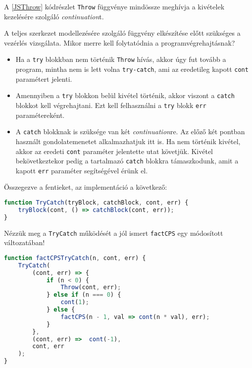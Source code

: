A \ref{JSThrow} kódrészlet \texttt{Throw} függvénye mindössze meghívja a kivételek kezelésére szolgáló \textit{continuation}t.

A teljes szerkezet modellezésére szolgáló függvény elkészítése előtt szükséges a vezérlés vizsgálata. Mikor merre kell folytatódnia a programvégrehajtásnak?

\begin{itemize}
    \item Ha a \texttt{try} blokkban nem történik \texttt{Throw} hívás, akkor úgy fut tovább a program, mintha nem is lett volna \texttt{try-catch}, ami az eredetileg kapott \texttt{cont} paramétert jelenti.
    \item Amennyiben a \texttt{try} blokkon belül kivétel történik, akkor viszont a \texttt{catch} blokkot kell végrehajtani. Ezt kell felhasználni a \texttt{try} blokk \texttt{err} paramétereként.
    \item A \texttt{catch} blokknak is szüksége van két \textit{continuation}re. Az előző két pontban használt gondolatemenetet alkalmazhatjuk itt is. Ha nem történik kivétel, akkor az eredeti \texttt{cont} paraméter jelentette utat követjük. Kivétel bekövetkeztekor pedig a tartalmazó \texttt{catch} blokkra támaszkodunk, amit a kapott \texttt{err} paraméter segítségével érünk el.
\end{itemize}

Összegezve a fentieket, az implementáció a következő:

\begin{lstlisting}[language=JavaScript, caption={A \textit{try-catch} blokk \textit{CPS}-ben}, captionpos=b, label=JSTryCatch]
function TryCatch(tryBlock, catchBlock, cont, err) {
    tryBlock(cont, () => catchBlock(cont, err));
}
\end{lstlisting}

Nézzük meg a \texttt{TryCatch} működését a jól ismert \texttt{factCPS} egy módosított változatában!

\begin{lstlisting}[language=JavaScript, caption={Faktoriálist kiszámító függvény \textit{CPS}-ben, \texttt{try-catch} szerkezettel}, captionpos=b, label=JSCPSFactTryCatch]
function factCPSTryCatch(n, cont, err) {
    TryCatch(
        (cont, err) => {
            if (n < 0) {
                Throw(cont, err); 
            } else if (n === 0) {
                cont(1);
            } else {
                factCPS(n - 1, val => cont(n * val), err);
            }    
        }, 
        (cont, err) =>  cont(-1),
        cont, err
    );
}
\end{lstlisting}

